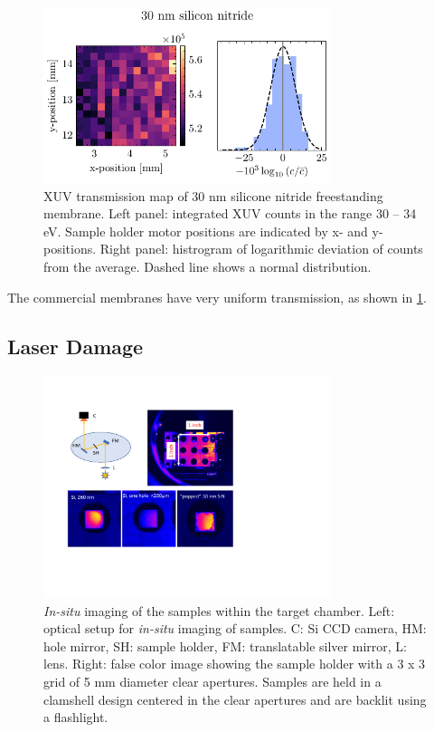 \begin{figure}
	\centering
	\includegraphics[width=0.75\textwidth]{figures/chap4/nitride_map.pdf}
	\caption{XUV transmission map of 30 nm silicone nitride freestanding membrane. Left panel: integrated XUV counts in the range 30 -- 34 eV. Sample holder motor positions are indicated by x- and y-positions. Right panel: histrogram of logarithmic deviation of counts from the average. Dashed line shows a normal distribution.}
	\label{fig:nitride_map}
\end{figure}

The commercial membranes have very uniform transmission, as shown in \cref{fig:nitride_map}.

\subsection{Laser Damage}
\label{sec:laser_damage}

\begin{figure}
	\centering
	\includegraphics[width=0.75\textwidth]{figures/chap4/sample_holder_damage.pdf}
	\caption{\textit{In-situ} imaging of the samples within the target chamber. Left: optical setup for \textit{in-situ} imaging of samples. C: Si CCD camera, HM: hole mirror, SH: sample holder, FM: translatable silver mirror, L: lens. Right: false color image showing the sample holder with a 3 x 3 grid of 5 mm diameter clear apertures. Samples are held in a clamshell design centered in the clear apertures and are backlit using a flashlight.}
	\label{fig:sample_holder_damage}
\end{figure}

